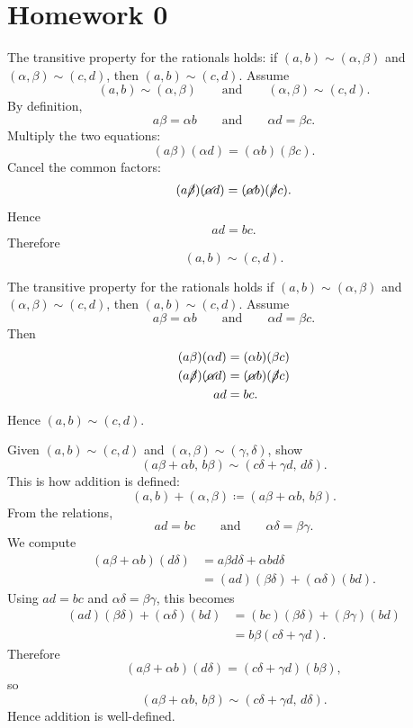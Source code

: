 
\section{Homework 0}

\begin{problem}{
    \label{ex:0.1}
    The transitive property for the rationals holds: if $(a,b)\sim(\alpha,\beta)$ and $(\alpha,\beta)\sim(c,d)$, then $(a,b)\sim(c,d)$.
}
    Assume
    \[
        (a,b)\sim(\alpha,\beta)
        \qquad\text{and}\qquad
        (\alpha,\beta)\sim(c,d).
    \]
    By definition,
    \[
        a\beta=\alpha b
        \qquad\text{and}\qquad
        \alpha d=\beta c.
    \]
    Multiply the two equations:
    \[
        (a\beta)(\alpha d)=(\alpha b)(\beta c).
    \]
    Cancel the common factors:
    \[
        (a\cancel{\beta})(\cancel{\alpha}d)=(\cancel{\alpha}b)(\cancel{\beta}c).
    \]
    Hence
    \[
        ad=bc.
    \]
    Therefore
    \[
        (a,b)\sim(c,d).
    \]
\end{problem}

\begin{problem}{
    The transitive property for the rationals holds if $(a,b)\sim(\alpha,\beta)$ and $(\alpha,\beta)\sim(c,d)$, then $(a,b)\sim(c,d)$.
}
    Assume
    \[
        a\beta=\alpha b
        \qquad\text{and}\qquad
        \alpha d=\beta c.
    \]
    Then
    \begin{align*}
        (a\beta)(\alpha d)
&=(\alpha b)(\beta c)\\
(a\cancel{\beta})(\cancel{\alpha}d)
&=(\cancel{\alpha}b)(\cancel{\beta}c)\\
ad&=bc.
    \end{align*}
    Hence $(a,b)\sim(c,d)$.
\end{problem}

\begin{problem}{
    Given $(a,b)\sim(c,d)$ and $(\alpha,\beta)\sim(\gamma,\delta)$, show
    \[
        (a\beta+\alpha b,\,b\beta)\sim(c\delta+\gamma d,\,d\delta).
    \]
    This is how addition is defined:
    \[
        (a,b)+(\alpha,\beta)\coloneqq (a\beta+\alpha b,\,b\beta).
    \]
}
    From the relations,
    \[
        ad=bc
        \qquad\text{and}\qquad
        \alpha\delta=\beta\gamma.
    \]
    We compute
    \begin{align*}
        (a\beta+\alpha b)(d\delta)
&=a\beta d\delta+\alpha bd\delta\\
&=(ad)(\beta\delta)+(\alpha\delta)(bd).
    \end{align*}
    Using $ad=bc$ and $\alpha\delta=\beta\gamma$, this becomes
    \begin{align*}
        (ad)(\beta\delta)+(\alpha\delta)(bd)
    &=(bc)(\beta\delta)+(\beta\gamma)(bd)\\
        &=b\beta(c\delta+\gamma d).
    \end{align*}
    Therefore
    \[
        (a\beta+\alpha b)(d\delta)=(c\delta+\gamma d)(b\beta),
    \]
    so
    \[
        (a\beta+\alpha b,\,b\beta)\sim(c\delta+\gamma d,\,d\delta).
    \]
    Hence addition is well-defined.
\end{problem}

